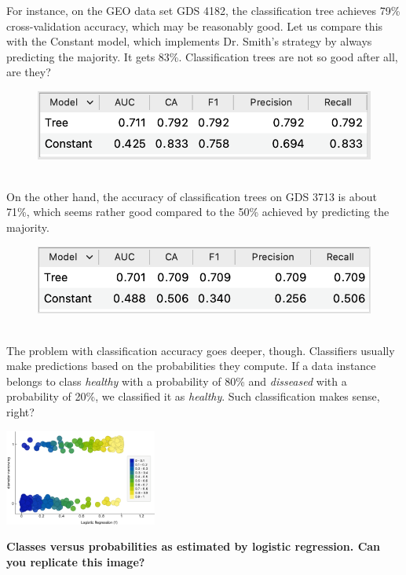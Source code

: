For instance, on the GEO data set GDS 4182, the classification tree achieves 79\% cross-validation accuracy, which may be reasonably good. Let us compare this with the Constant model, which implements Dr. Smith's strategy by always predicting the majority. It gets 83\%. Classification trees are not so good after all, are they?

%
\begin{figure}[h]
    \centering
    \includegraphics[scale=0.5]{accuracy-4182.png}
    \caption{$\;$}
\end{figure}

On the other hand, the accuracy of classification trees on GDS 3713 is about 71\%, which seems rather good compared to the 50\% achieved by predicting the majority.

\begin{figure}[h]
    \centering
    \includegraphics[scale=0.5]{accuracy-3713.png}
    \caption{$\;$}
\end{figure}

The problem with classification accuracy goes deeper, though.
Classifiers usually make predictions based on the probabilities they compute. If a data instance belongs to class {\em healthy} with a probability of 80\% and {\em disseased} with a probability of 20\%, we classified it as {\em healthy}. Such classification makes sense, right?

\begin{marginfigure}
    \includegraphics[width=50mm]{log-reg-results.png}%
    \caption{\textbf{\textsf{Classes versus probabilities as estimated by logistic regression. Can you replicate this image?}}}
\end{marginfigure}

